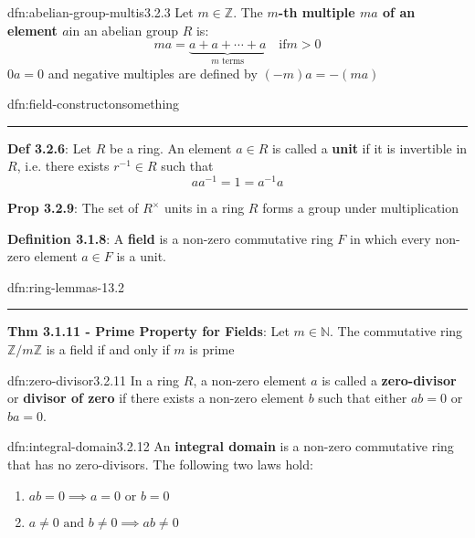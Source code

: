 \documentclass[landscape, 8pt]{extarticle}
\begin{document}
\begin{multicols}{3}
\begin{dfn}{dfn:abelian-group-multis}{3.2.3}
    Let $m\in \mathbb{Z}$. The \textbf{$m$-th multiple $ma$ of an element $a$}in an abelian group $R$ is:
    \[ma = \underbrace{a + a + \cdots + a}_{\text{$m$ terms}} \quad \text{if} m > 0\]
    $0a = 0$ and negative multiples are defined by $(-m)a = -(ma)$
\end{dfn}


\begin{dfn}{dfn:field-constructon}{something}
    \noindent\rule{\textwidth}{0.2pt}
    \textbf{Def 3.2.6}: Let $R$ be a ring. An element $a\in R$ is called a \textbf{unit} if it is invertible in $R$, i.e. there exists $r^{-1}\in R$ such that
    \[a a^{-1} = 1 = a^{-1}a\]

    \textbf{Prop 3.2.9}: The set of $R^{\times}$ units in a ring $R$ forms a group under multiplication

    \textbf{Definition 3.1.8}: A \textbf{field} is a non-zero commutative ring $F$ in which every non-zero element $a\in F$ is a unit.
\end{dfn}

\newpage

\begin{thm}{dfn:ring-lemmas-1}{3.2}
    \noindent\rule{\textwidth}{0.2pt}
    \textbf{Thm 3.1.11 - Prime Property for Fields}: Let $m\in\mathbb{N}$. The commutative ring $\mathbb{Z} / m\mathbb{Z}$ is a field if and only if $m$ is prime
\end{thm}

\begin{dfn}{dfn:zero-divisor}{3.2.11}
    In a ring $R$, a non-zero element $a$ is called a \textbf{zero-divisor} or \textbf{divisor of zero} if there exists a non-zero element $b$ such that either $ab = 0$ or $ba = 0$.
\end{dfn}

\begin{dfn}{dfn:integral-domain}{3.2.12}
    An \textbf{integral domain} is a non-zero commutative ring that has no zero-divisors. The following two laws hold:
    \begin{enumerate}
        \setlength\itemsep{0em}
        \item $ab = 0 \implies a = 0 \text{ or } b = 0$
        \item $a \ne 0 \text{ and } b \ne 0 \implies ab \ne 0$
    \end{enumerate}
\end{dfn}



\end{multicols}
\end{document}
